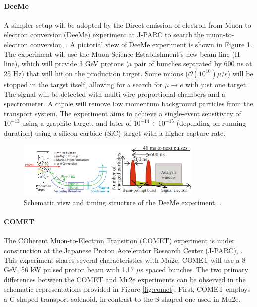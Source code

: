 \paragraph{DeeMe}
A simpler setup will be adopted 
by the Direct emission of electron 
from Muon to electron conversion (DeeMe) 
experiment at J-PARC to search 
the muon-to-electron conversion, \cite{deeme}.
A pictorial view of DeeMe experiment is shown in Figure 
\ref{fig:deeme}.
The experiment will use the Muon 
Science Establishment's new beam-line (H-line), 
which will provide 3 GeV protons 
(a pair of bunches separated by 600 ns at 25 Hz) 
that will hit on the production target. 
Some muons ($\mathcal{O}(10^{10})\mu$/s) 
will be stopped in the target itself, 
allowing for a search for $\mu \rightarrow e$ 
with just one target. The signal will be detected 
with multi-wire proportional chambers and a 
spectrometer. 
A dipole will remove low momentum background 
particles from the transport system. 
The experiment aims to achieve a single-event 
sensitivity of $10^{-13}$ using a graphite target, 
and later of $10^{-14} \div 10^{-15}$ 
(depending on running duration) using a 
silicon carbide (SiC) target with a higher 
capture rate. 
\begin{figure}[!h]
    \centering
    \includegraphics[width =0.8\textwidth]{figures/png/Screenshot_20240322_101840.png}
    \caption[DeeMe experiment.]{Schematic view 
    and timing structure of the DeeMe experiment, \cite{deeme}.}
    \label{fig:deeme}
\end{figure}
\paragraph{COMET}
The COherent Muon-to-Electron 
Transition (COMET) experiment is 
under construction at
the Japanese Proton Accelerator 
Research Center (J-PARC), \cite{Abramishvili_2020}. 
This experiment shares several 
characteristics with Mu2e. COMET 
will use a 8 GeV, 56 kW pulsed proton beam
with 1.17 $\mu$s spaced bunches. 
The two primary differences between 
the COMET and Mu2e experiments can 
be observed in the schematic representations 
provided in Figure \ref{fig:comet}. First, 
COMET employs a C-shaped transport solenoid, 
in contrast to the S-shaped one used in Mu2e. 


